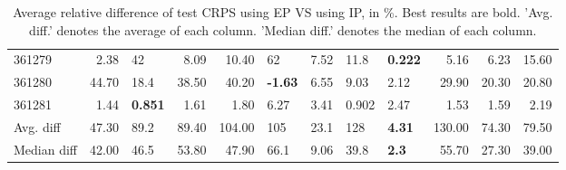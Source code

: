 \begin{table}[ht!]
\begin{tabular}{lrlrrllllrrr}
  361279 & 2.38 & 42 & 8.09 & 10.40 & 62 & 7.52 & 11.8 & \textbf{0.222} & 5.16 & 6.23 & 15.60 \\ 
  361280 & 44.70 & 18.4 & 38.50 & 40.20 & \textbf{-1.63} & 6.55 & 9.03 & 2.12 & 29.90 & 20.30 & 20.80 \\ 
  361281 & 1.44 & \textbf{0.851} & 1.61 & 1.80 & 6.27 & 3.41 & 0.902 & 2.47 & 1.53 & 1.59 & 2.19 \\ 
   \hline
Avg. diff & 47.30 & 89.2 & 89.40 & 104.00 & 105 & 23.1 & 128 & \textbf{4.31} & 130.00 & 74.30 & 79.50 \\ 
  Median diff & 42.00 & 46.5 & 53.80 & 47.90 & 66.1 & 9.06 & 39.8 & \textbf{2.3} & 55.70 & 27.30 & 39.00 \\ 
   \hline
\hline
\end{tabular}
\endgroup
\caption{Average relative difference of test CRPS using EP VS using IP, in \%. 
                  Best results are bold. 
                  'Avg. diff.' denotes the average of each column.
                  'Median diff.' denotes the median of each column.} 
\label{TABLES/table_results_CRPS_mahalanobis_only_num_EP_VS_IP}
\end{table}
